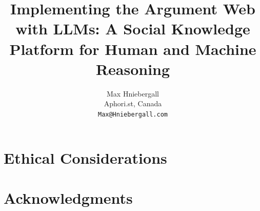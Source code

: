 \documentclass[11pt]{article}
\title{Implementing the Argument Web with LLMs: A Social Knowledge Platform for Human and Machine Reasoning}
\author{Max Hniebergall \\
  Aphori.st, Canada\\
  \texttt{Max@Hniebergall.com} }
\begin{document}
\maketitle

\begin{abstract}

\end{abstract}











\section*{Ethical Considerations}


\section*{Acknowledgments}


%


\appendix

\end{document}
